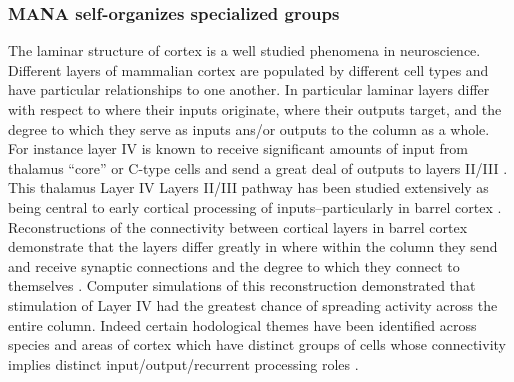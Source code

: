 \documentclass[10pt,letterpaper]{article}
\begin{document}
\subsubsection*{MANA self-organizes specialized groups}

The laminar structure of cortex is a well studied phenomena in neuroscience. Different layers of mammalian cortex are populated by different cell types and have particular relationships to one another. In particular laminar layers differ with respect to where their inputs originate, where their outputs target, and the degree to which they serve as inputs ans/or outputs to the column as a whole. For instance layer IV is known to receive significant amounts of input from thalamus ``core'' or C-type cells \cite{jones1998viewpoint} and send a great deal of outputs to layers II/III \cite{lefort2009excitatory, yassin2010embedded, benedetti2012differential, harris2015neocortical}. This thalamus \textrightarrow Layer IV \textrightarrow Layers II/III pathway has been studied extensively as being central to early cortical processing of inputs--particularly in barrel cortex \cite{armstrong1987spatiotemporal, armstrong1992flow, ahissar2000transformation, brecht2002dynamic, lefort2009excitatory}. Reconstructions of the connectivity between cortical layers in barrel cortex demonstrate that the layers differ greatly in where within the column they send and receive synaptic connections and the degree to which they connect to themselves \cite{lefort2009excitatory}. Computer simulations of this reconstruction demonstrated that stimulation of Layer IV had the greatest chance of spreading activity across the entire column. Indeed certain hodological themes have been identified across species and areas of cortex which have distinct groups of cells whose connectivity implies distinct input/output/recurrent processing roles \cite{harris2015neocortical}.
\end{document}
